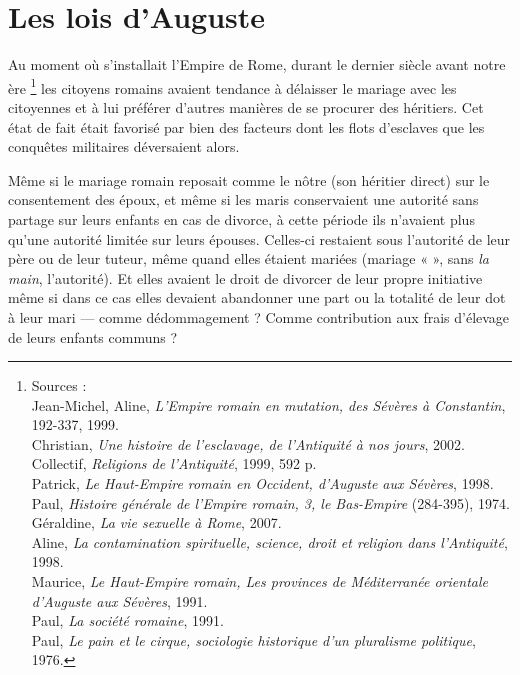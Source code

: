 

\chapter{Les lois d'Auguste}

 Au moment où s'installait l'Empire de Rome, durant le dernier siècle avant notre ère%
\footnote{Sources :\\
 Jean-Michel,  Aline, \emph{L'Empire romain en mutation, des Sévères à Constantin}, 192-337, 1999.\\
 Christian, \emph{Une histoire de l'esclavage, de l'Antiquité à nos jours}, 2002.\\
Collectif, \emph{Religions de l'Antiquité}, 1999, 592 p.\\
 Patrick, \emph{Le Haut-Empire romain en Occident, d'Auguste aux Sévères}, 1998.\\
 Paul, \emph{Histoire générale de l'Empire romain, 3, le Bas-Empire} (284-395), 1974.\\
 Géraldine, \emph{La vie sexuelle à Rome}, 2007.\\
 Aline, \emph{La contamination spirituelle, science, droit et religion dans l'Antiquité}, 1998.\\
 Maurice, \emph{Le Haut-Empire romain, Les provinces de Méditerranée orientale d'Auguste aux Sévères}, 1991.\\
 Paul, \emph{La société romaine}, 1991.\\
 Paul, \emph{Le pain et le cirque, sociologie historique d'un pluralisme politique}, 1976.}
les citoyens romains avaient tendance à délaisser le mariage avec les citoyennes et à lui préférer d'autres manières de se procurer des héritiers. Cet état de fait était favorisé par bien des facteurs dont les flots d'esclaves que les conquêtes militaires déversaient alors. 

 Même si le mariage romain reposait comme le nôtre (son héritier direct) sur le consentement des époux, et même si les maris conservaient une autorité sans partage sur leurs enfants en cas de divorce, à cette période ils n'avaient plus qu'une autorité limitée sur leurs épouses. Celles-ci restaient sous l'autorité de leur père ou de leur tuteur, même quand elles étaient mariées (mariage «  », sans \emph{la main}, l'autorité). Et elles avaient le droit de divorcer de leur propre initiative même si dans ce cas elles devaient abandonner une part ou la totalité de leur dot à leur mari --- comme dédommagement ? Comme contribution aux frais d'élevage de leurs enfants communs ?

